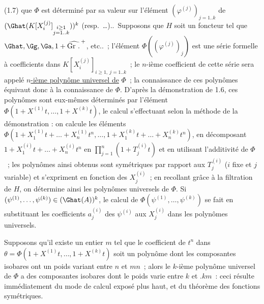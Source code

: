 
(1.7) que \(\Phi\) est
déterminé par sa valeur sur l'élément \((\varphi^{(j)})_{j=1..k}\) de \((\Ghat(K[X_i^{(j)}]_{\substack{i\geq1\\ j=1..k}}))^k\) (resp.\ \ldots)..\ Supposons que \(H\) soit un foncteur tel que \(\Ghat,\Gg,\Ga,1+\widehat{\operatorname{Gr}\,\mathord{.}\,}^{+}\), etc..~; l'élément \(\Phi((\varphi^{(j)})_{j})\) est une série formelle à coefficients dans \(K[X_i^{(j)}]_{i\geq1,\ j=1..k}\)~; le \(n\)-ième coefficient de cette série sera appelé \uline{\(n\)-ième polynôme universel de} \(\Phi\)~; la connaissance de ces polynômes équivaut donc à la connaissance de \(\Phi\). D'après la démonstration de 1.6, ces polynômes sont eux-mêmes déterminés par l'élément \(\Phi(1+X^{(1)}t,\ldots,1+X^{(k)}t)\), le calcul s'effectuant selon la méthode de la démonstration : on calcule les éléments \(\Phi(1+X_1^{(1)}t+\ldots+X_n^{(1)}t^n,\ldots,1+X_1^{(k)}t+\ldots+X_n^{(k)}t^n)\), en décomposant \(1+X_1^{(i)}t+\ldots+X_n^{(i)}t^n\) en \(\prod_{j=1}^{n}(1+T_j^{(i)}t)\) et en utilisant l'additivité de \(\Phi\)~; les polynômes ainsi obtenus sont symétriques par rapport aux \(T_j^{(i)}\) (\(i\) fixe et \(j\) variable) et s'expriment en fonction des \(X_j^{(i)}\)~; en recollant grâce à la filtration de \(H\), on détermine ainsi les polynômes universels de \(\Phi\). Si \((\psi^{(1)},\ldots,\psi^{(k)})\in(\Ghat(A))^k\), le calcul de \(\Phi(\psi^{(1)},\ldots,\psi^{(k)})\) se fait en substituant les coefficients \(a_j^{(i)}\) des \(\psi^{(i)}\) aux \(X_j^{(i)}\) dans les polynômes universels.

Supposons qu'il existe un entier \(m\) tel que le coefficient de \(t^n\) dans \(\theta=\Phi(1+X^{(1)}t,\ldots,1+X^{(k)}t)\) soit un polynôme dont les composantes isobares ont un poids variant entre \(n\) et \(mn\)~; alors le \(k\)-ième polynôme universel de \(\Phi\) a des composantes isobares dont le poids varie entre \(k\) et \(\mathord{.}km\)~: ceci résulte immédiatement du mode de calcul exposé plus haut, et du théorème des fonctions symétriques.

